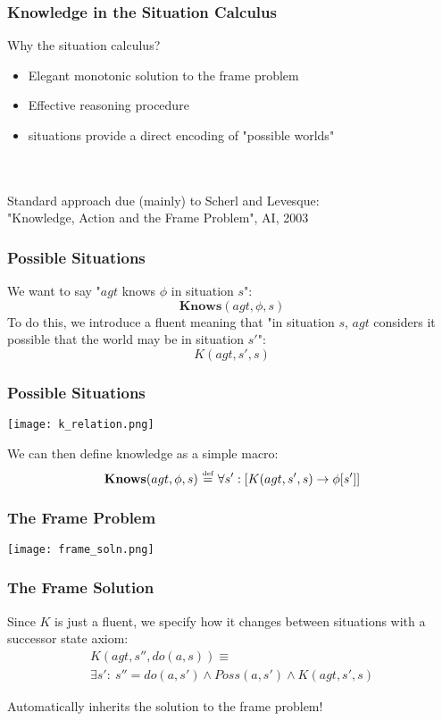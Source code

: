 \documentclass{beamer}
\newcommand{\isdef}{\hbox{$\stackrel{\mbox{\tiny def}}{=}$}}
\begin{document}
\begin{frame}
\frametitle{Knowledge in the Situation Calculus}

Why the situation calculus?
\begin{itemize}
\item Elegant monotonic solution to the frame problem
\item Effective reasoning procedure
\item situations provide a direct encoding of "possible worlds"
\end{itemize}
\ \\
\ \\
Standard approach due (mainly) to Scherl and Levesque:\\
"Knowledge, Action and the Frame Problem", AI, 2003

\end{frame}

\begin{frame}
\frametitle{Possible Situations}
We want to say "$agt$ knows $\phi$ in situation $s$":
\begin{equation*}
\mathbf{Knows}(agt,\phi,s)
\end{equation*}
To do this, we introduce a fluent meaning that "in situation $s$, $agt$ considers it possible that the world may be in situation $s'$":
\begin{equation*}
K(agt,s',s)
\end{equation*}
\end{frame}

\begin{frame}
\frametitle{Possible Situations}
\begin{center}
  \texttt{[image: k\_relation.png]}
\end{center}

We can then define knowledge as a simple macro:
\[ \mathbf{Knows}(agt,\phi,s)\ \isdef\ \forall s':\left[K(agt,s',s)\rightarrow \phi[s']\right] \]
\end{frame}

\begin{frame}
\frametitle{The Frame Problem}
\begin{center}
  \texttt{[image: frame\_soln.png]}
\end{center}
\end{frame}

\begin{frame}
\frametitle{The Frame Solution}
Since $K$ is just a fluent, we specify how it changes  between situations
with a successor state axiom:
\begin{multline*}
K(agt,s'',do(a,s)) \equiv \\
\exists s': \ s''=do(a,s') \wedge Poss(a,s') \wedge K(agt,s',s)
\end{multline*}

Automatically inherits the solution to the frame problem!
\end{frame}
\end{document}
